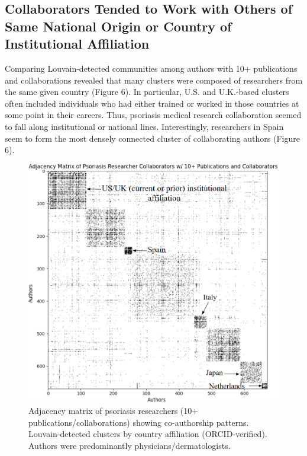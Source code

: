 \documentclass[9pt,twocolumn,twoside]{pnas-new}
\begin{document}
\subsection*{Collaborators Tended to Work with Others of Same National Origin or Country of Institutional Affiliation}
Comparing Louvain-detected communities among authors with 10+ publications and collaborations revealed that many clusters were composed of researchers from the same given country (Figure 6). In particular, U.S. and U.K.-based clusters often included individuals who had either trained or worked in those countries at some point in their careers. Thus, psoriasis medical research collaboration seemed to fall along institutional or national lines. Interestingly, researchers in Spain seem to form the most densely connected cluster of collaborating authors (Figure 6).
\begin{figure}[H]
    \centering
        \includegraphics[width=0.35\textheight]{LouvainClustering.png}
    \caption{Adjacency matrix of psoriasis researchers (10+ publications/collaborations) showing co-authorship patterns. Louvain-detected clusters by country affiliation (ORCID-verified). Authors were predominantly physicians/dermatologists.}
    \label{fig:LouvainClustering}
\end{figure}
\end{document}
